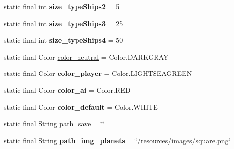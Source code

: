 \begin{DoxyCompactItemize}
static final int {\bfseries size\+\_\+type\+Ships2} = 5
\item 
\mbox{\label{classfr_1_1groupe40_1_1projet_1_1util_1_1_constantes_a8a1165315455a43e2bb104a062fb5943}} 
static final int {\bfseries size\+\_\+type\+Ships3} = 25
\item 
\mbox{\label{classfr_1_1groupe40_1_1projet_1_1util_1_1_constantes_ab3eb4d8a8fcd19d792f7e7d93c650746}} 
static final int {\bfseries size\+\_\+type\+Ships4} = 50
\item 
static final Color \mbox{\hyperlink{classfr_1_1groupe40_1_1projet_1_1util_1_1_constantes_ab371ca0a12a467e674717725bf528c80}{color\+\_\+neutral}} = Color.\+D\+A\+R\+K\+G\+R\+AY
\item 
\mbox{\label{classfr_1_1groupe40_1_1projet_1_1util_1_1_constantes_a203dab4561bb9bd05828a81f1bfa61b5}} 
static final Color {\bfseries color\+\_\+player} = Color.\+L\+I\+G\+H\+T\+S\+E\+A\+G\+R\+E\+EN
\item 
\mbox{\label{classfr_1_1groupe40_1_1projet_1_1util_1_1_constantes_ab926a9ffae54037d9d5666cf53a913ef}} 
static final Color {\bfseries color\+\_\+ai} = Color.\+R\+ED
\item 
\mbox{\label{classfr_1_1groupe40_1_1projet_1_1util_1_1_constantes_abce28375ccffaf58e7eb520bdff56f08}} 
static final Color {\bfseries color\+\_\+default} = Color.\+W\+H\+I\+TE
\item 
static final String \mbox{\hyperlink{classfr_1_1groupe40_1_1projet_1_1util_1_1_constantes_a594d78730a1028de3d6e5f757fb48d89}{path\+\_\+save}} = \char`\"{}\char`\"{}
\item 
\mbox{\label{classfr_1_1groupe40_1_1projet_1_1util_1_1_constantes_a11fde697725ee4aa2333f7423cf60863}} 
static final String {\bfseries path\+\_\+img\+\_\+planets} = \char`\"{}/resources/images/square.\+png\char`\"{}
\item 
\mbox{\label{classfr_1_1groupe40_1_1projet_1_1util_1_1_constantes_a108da68ced1e893fdd226931dcf1d663}} 

\end{DoxyCompactItemize}
